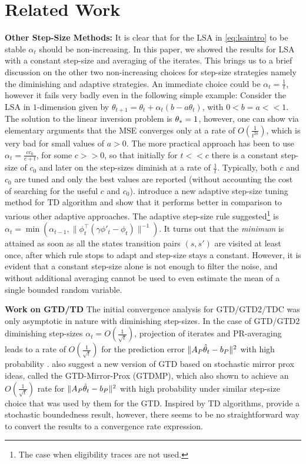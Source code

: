 \section{Related Work}\label{sec:related}
\textbf{Other Step-Size Methods: }It is clear that for the LSA in \eqref{eq:lsaintro} to be stable $\alpha_t$ should be non-increasing. In this paper, we showed the results for LSA with a constant step-size and averaging of the iterates.  This brings us to a brief discussion on the other two non-increasing choices for step-size strategies namely the diminishing and adaptive strategies.
An immediate choice could be $\alpha_t=\frac{1}{t}$, however it fails very badly even in the following simple example: Consider the LSA in $1$-dimension given by $\theta_{t+1}=\theta_t+\alpha_t(b-a\theta_t)$, with $0<b=a<<1$. The solution to the linear inversion problem is $\theta_*=1$, however, one can show via elementary arguments that the MSE converges only at a rate of $O(\frac{1}{t^{2a}})$, which is very bad for small values of $a>0$. The more practical approach has been to use $\alpha_t=\frac{cc_0}{c+t}$, for some $c>>0$, so that initially for $t<<c$ there is a constant step-size of $c_0$ and later on the step-sizes diminish at a rate of $\frac{1}{t}$. Typically, both $c$ and $c_0$ are tuned and only the best values are reported (without accounting the cost of searching for the useful $c$ and $c_0$). \citet{dab} introduce a new adaptive step-size tuning method for TD algorithm and show that it performs better in comparison to various other adaptive approaches. The adaptive step-size rule suggested\footnote{The case when eligibility traces are not used.} is $\alpha_t=\min(\alpha_{t-1},\parallel\phi^\top_t(\gamma\phi'_t-\phi_t)\parallel^{-1})$. It turns out that the \emph{minimum} is attained as soon as all the states transition pairs $(s,s')$ are visited at least once, after which rule stops to adapt and step-size stays a constant. However, it is evident that a constant step-size alone is not enough to filter the noise, and without additional averaging cannot be used to even estimate the mean of a single bounded random variable. 

\textbf{Work on GTD/TD} The initial convergence analysis for GTD/GTD2/TDC was only asymptotic in nature \cite{gtd,gtd2} with diminishing step-sizes.
In the case of GTD/GTD2 diminishing step-sizes $\alpha_t=O(\frac{1}{\sqrt{t}})$, projection of iterates and PR-averaging leads to a rate of $O(\frac{1}{\sqrt{t}})$ 
for the prediction error $\| A_P\hat{\theta}_t-b_P\|^2$ with high probability \cite{gtdmp}. 
\citet{gtdmp} also suggest a new version of GTD based on stochastic mirror prox ideas, called the GTD-Mirror-Prox (GTDMP), 
which also shown to achieve an $O(\frac{1}{\sqrt{t}})$ rate for $\| A_P\hat{\theta}_t-b_P\|^2$ with high probability under similar step-size choice that was used by them for the GTD. Inspired by TD algorithms, \citet{dalal} provide a stochastic boundedness result, however, there seems to be no straightforward way to convert the results to a convergence rate expression.


